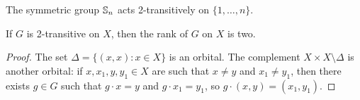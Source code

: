 The symmetric group $\mathbb{S}_n$ acts 2-transitively on $\{1,\dots,n\}$. 

\begin{proposition}
    If $G$ is 2-transitive on $X$, then the rank of $G$ on $X$ is two. 
\end{proposition}

\begin{proof}
    The set $\Delta=\{(x,x):x\in X\}$ is an orbital. The complement
    $X\times X\setminus\Delta$ is another orbital: if $x,x_1,y,y_1\in X$
    are such that $x\ne y$ 
    and $x_1\ne y_1$, then there exists $g\in G$ such that 
    $g\cdot x=y$ and $g\cdot x_1=y_1$, so $g\cdot (x,y)=(x_1,y_1)$. 
\end{proof}